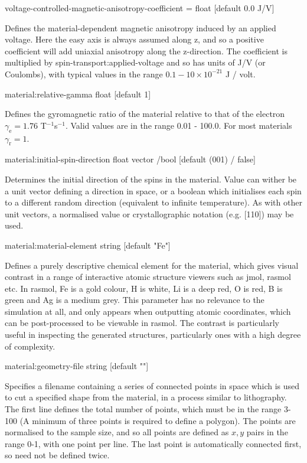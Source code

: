 {\zicf voltage-controlled-magnetic-anisotropy-coefficient = float [default 0.0 J/V]}
Defines the material-dependent magnetic anisotropy induced by an applied voltage.
Here the easy axis is always assumed along z, and so a positive coefficient will
add uniaxial anisotropy along the z-direction. The coefficient is multiplied by
spin-transport:applied-voltage and so has units of J/V (or Coulombs), with typical
values in the range $0.1-10 \times 10^{-21}$ J / volt.


{\zicf material:relative-gamma float [default 1]} Defines the gyromagnetic ratio of the material relative to that of the electron $\gamma_{\mathrm{e}} = 1.76$ T$^{-1}$s$^{-1}$. Valid values are in the range 0.01 - 100.0. For most materials $\gamma_{\mathrm{r}} = 1$.

{\zicf material:initial-spin-direction float vector /bool [default (001) / false]} Determines the initial direction of the spins in the material. Value can wither be a unit vector defining a direction in space, or a boolean which initialises each spin to a different random direction (equivalent to infinite temperature). As with other unit vectors, a  normalised value or crystallographic notation (e.g. [110]) may be used.

{\zicf material:material-element string [default "Fe"]} Defines a purely descriptive chemical element for the material, which gives visual contrast in a range of interactive atomic structure viewers such as jmol, rasmol etc. In rasmol, Fe is a gold colour, H is white, Li is a deep red, O is red, B is green and Ag is a medium grey. This parameter has no relevance to the simulation at all, and only appears when outputting atomic coordinates, which can be post-processed to be viewable in rasmol. The contrast is particularly useful in inspecting the generated structures, particularly ones with a high degree of complexity.

{\zicf material:geometry-file string [default ""]} Specifies a filename containing a series of connected points in space which is used to cut a specified shape from the material, in a process similar to lithography. The first line defines the total number of points, which must be in the range 3-100 (A minimum of three points is required to define a polygon). The points are normalised to the sample size, and so all points are defined as $x,y$ pairs in the range 0-1, with one point per line. The last point is automatically connected first, so need not be defined twice.

